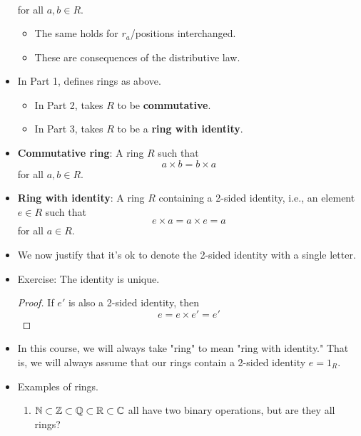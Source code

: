 \documentclass[../notes.tex]{subfiles}
\begin{document}
\begin{itemize}
\begin{align*}
    \end{align*}
    for all $a,b\in R$.
    \begin{itemize}
        \item The same holds for $r_a$/positions interchanged.
        \item These are consequences of the distributive law.
    \end{itemize}
    \item In Part 1, \textcite{bib:DummitFoote} defines rings as above.
    \begin{itemize}
        \item In Part 2, \textcite{bib:DummitFoote} takes $R$ to be \textbf{commutative}.
        \item In Part 3, \textcite{bib:DummitFoote} takes $R$ to be a \textbf{ring with identity}.
    \end{itemize}
    \item \textbf{Commutative ring}: A ring $R$ such that
    \begin{equation*}
        a\times b = b\times a
    \end{equation*}
    for all $a,b\in R$.
    \item \textbf{Ring with identity}: A ring $R$ containing a 2-sided identity, i.e., an element $e\in R$ such that
    \begin{equation*}
        e\times a = a\times e = a
    \end{equation*}
    for all $a\in R$.
    \item We now justify that it's ok to denote the 2-sided identity with a single letter.
    \item Exercise: The identity is unique.
    \begin{proof}
        If $e'$ is also a 2-sided identity, then
        \begin{equation*}
            e = e\times e' = e'
        \end{equation*}
    \end{proof}
    \item In this course, we will always take "ring" to mean "ring with identity." That is, we will always assume that our rings contain a 2-sided identity $e=1_R$.
    \item Examples of rings.
    \begin{enumerate}
        \item $\mathbb{N}\subset\mathbb{Z}\subset\mathbb{Q}\subset\mathbb{R}\subset\mathbb{C}$ all have two binary operations, but are they all rings?
        \begin{itemize}

\end{itemize}
\end{enumerate}
\end{itemize}
\end{document}
